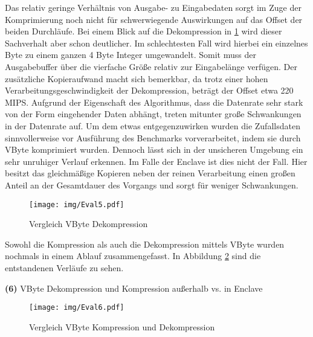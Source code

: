 Das relativ geringe Verhältnis von Ausgabe- zu Eingabedaten sorgt im Zuge der Komprimierung noch nicht für schwerwiegende Auswirkungen auf das Offset der beiden Durchläufe. Bei einem Blick auf die Dekompression in \ref{fig:eval5} wird dieser Sachverhalt aber schon deutlicher. Im schlechtesten Fall wird hierbei ein einzelnes Byte zu einem ganzen 4 Byte Integer umgewandelt. Somit muss der Ausgabebuffer über die vierfache Größe relativ zur Eingabelänge verfügen. Der zusätzliche Kopieraufwand macht sich bemerkbar, da trotz einer hohen Verarbeitungsgeschwindigkeit der Dekompression, beträgt der Offset etwa 220 MIPS. Aufgrund der Eigenschaft des Algorithmus, dass die Datenrate sehr stark von der Form eingehender Daten abhängt, treten mitunter große Schwankungen in der Datenrate auf. Um dem etwas entgegenzuwirken wurden die Zufallsdaten sinnvollerweise vor Ausführung des Benchmarks vorverarbeitet, indem sie durch VByte komprimiert wurden. Dennoch lässt sich in der unsicheren Umgebung ein sehr unruhiger Verlauf erkennen. Im Falle der Enclave ist dies nicht der Fall. Hier besitzt das gleichmäßige Kopieren neben der reinen Verarbeitung einen großen Anteil an der Gesamtdauer des Vorgangs und sorgt für weniger Schwankungen.

\begin{figure}[h]
	\texttt{[image: img/Eval5.pdf]}
	\centering
	\caption{Vergleich VByte Dekompression}
	\label{fig:eval5}
\end{figure}

Sowohl die Kompression als auch die Dekompression mittels VByte wurden nochmals in einem Ablauf zusammengefasst. In Abbildung \ref{fig:eval6} sind die entstandenen Verläufe zu sehen.

\item \textbf{(6)} VByte Dekompression und Kompression außerhalb vs. in Enclave
\begin{figure}[h]
	\texttt{[image: img/Eval6.pdf]}
	\centering
	\caption{Vergleich VByte Kompression und Dekompression}
	\label{fig:eval6}
\end{figure}

